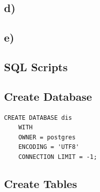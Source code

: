 \documentclass[ngerman]{dis-template-add}
\begin{document}
\subsection*{d)}

\subsection*{e)}










\subsection*{SQL Scripts}

\subsection*{Create Database}

\begin{verbatim}
CREATE DATABASE dis
    WITH 
    OWNER = postgres
    ENCODING = 'UTF8'
    CONNECTION LIMIT = -1;
\end{verbatim}


\subsection*{Create Tables}
\end{document}

